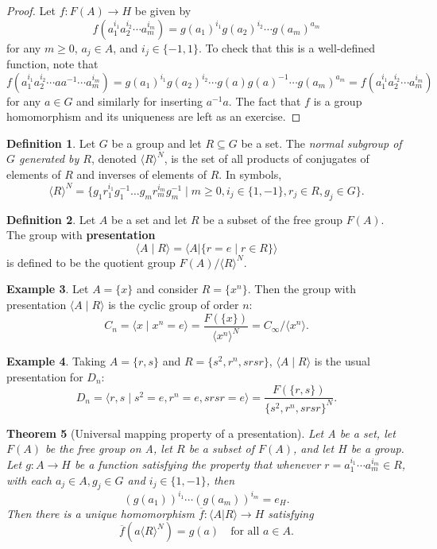 \documentclass[12pt]{report}
\newtheorem{theorem}{Theorem}[chapter]
\numberwithin{equation}{section}
\numberwithin{theorem}{chapter}
\theoremstyle{definition}
\newtheorem{definition}[theorem]{Definition}
\newtheorem{example}[theorem]{Example}
\newtheorem*{basic properties}{Basic Properties}
\newtheorem*{Important Remark}{Important Remark}
\begin{document}
\begin{proof}
Let $f\!:F(A) \to H$ be given by 
$$f(a_1^{i_1}a_2^{i_2}\cdots a_m^{i_m})=g(a_1)^{i_1}g(a_2)^{i_2}\cdots g(a_m)^{a_m}$$
for any $ m\geqslant 0$, $a_j \in A$, and $i_j\in\{-1,1\}$. 
To check that this is a well-defined function, note that
$$f(a_1^{i_1}a_2^{i_2}\cdots aa^{-1}\cdots a_m^{i_m})=g(a_1)^{i_1}g(a_2)^{i_2}\cdots g(a)g(a)^{-1}\cdots g(a_m)^{a_m}=f(a_1^{i_1}a_2^{i_2}\cdots a_m^{i_m})$$ 
for any $a\in G$ and similarly for inserting $a^{-1}a$. The fact that $f$ is a group homomorphism and its uniqueness are left as an exercise.
\end{proof}


\begin{definition}
Let $G$ be a group and let $R \subseteq G$ be a set. The {\em normal subgroup of $G$ generated by $R$}, denoted $\langle R \rangle ^N$, is the set of all products of conjugates of elements of $R$ and inverses of elements of $R$. In symbols, 
$$\langle R \rangle ^N= \{ g_1r_1^{i_1}g_1^{-1} \dots g_mr_m^{i_m}g_m^{-1} \mid m \geqslant 0, i_j \in \{1,-1\}, r_j \in R, g_j \in G \}.$$
\end{definition}


 \begin{definition}
 Let $A$ be a set and let $R$ be a subset of the free group $F(A)$. The group with {\bf presentation}  
$$\langle A \mid  R \rangle = \langle A | \{r = e \mid r \in R\} \rangle$$ 
is defined to be the quotient group $F(A)/\langle R \rangle ^N$.
\end{definition}




\begin{example}
Let $A=\{x\}$ and consider $R=\{x^n\}$. Then the group with presentation $\langle A \mid R \rangle$ is the cyclic group of order $n$:
$$C_n=\langle x \mid x^n=e\rangle = \frac{F(\{x\})}{\langle x^n\rangle ^N}=C_\infty/\langle x^n \rangle.$$
\end{example}

\begin{example}
Taking $A=\{r,s\}$ and $R=\{s^2,r^n,srsr\}$, $\langle A \mid R \rangle$ is the usual presentation for $D_{n}$:
$$D_{n}=\langle r,s \mid s^2=e,r^n=e,srsr=e \rangle =\frac{F\left( \{r,s\}\right)}{\{s^2,r^n,srsr\}^N}.$$
\end{example}



\begin{theorem}[Universal mapping property of a presentation]\label{UMP presentation}
 Let A be a set, let $F(A)$ be the free group on A, let $R$ be a subset of $F(A)$, and let $H$ be a group. Let $g\!:A \to H$ be a function satisfying the property that whenever $r = a_1^{i_1} \cdots a_m^{i_m} \in R$, with each $a_j \in A, g_j \in G$ and $i_j \in \{1,-1\}$, then 
 $$(g(a_1))^{i_1} \cdots (g(a_m))^{i_m} = e_H.$$ 
 Then there is a unique homomorphism $\overline{f}\!: \langle A | R \rangle \to H$ satisfying 
 $$\overline f(a\langle R\rangle ^N) = g(a) \quad \textrm{for all } a \in A.$$
\end{theorem}
\end{document}
